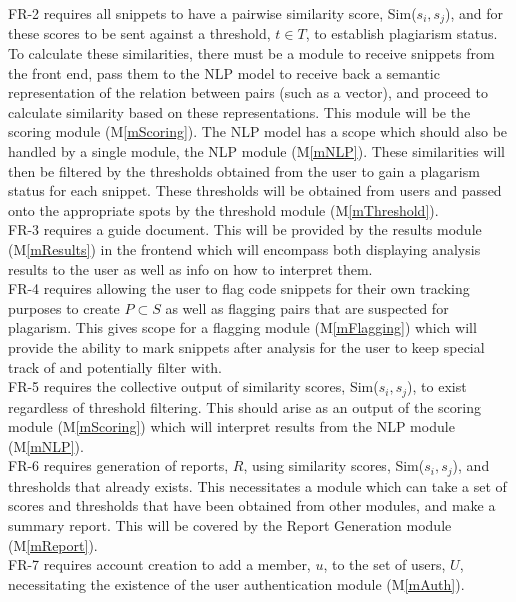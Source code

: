 \documentclass[12pt, titlepage]{article}
\newcommand{\mref}[1]{M\ref{#1}}
\begin{document}
FR-2 requires all snippets to have a pairwise similarity score, Sim($s_i, s_j$), 
and for these scores to be sent against a threshold, $t \in T$, to establish 
plagiarism status. To calculate these similarities, there must be a module to 
receive snippets from the front end, pass them to the NLP model to receive back 
a semantic representation of the relation between pairs (such as a vector), and 
proceed to calculate similarity based on these representations. This module will 
be the scoring module (\mref{mScoring}). The NLP model has a scope which should 
also be handled by a single module, the NLP module (\mref{mNLP}). These similarities 
will then be filtered by the thresholds obtained from the user to gain a plagarism 
status for each snippet. These thresholds will be obtained from users and passed 
onto the appropriate spots by the threshold module ({\mref{mThreshold}}).\\

FR-3 requires a guide document. This will be provided by the results module (\mref{mResults})
in the frontend which will encompass both displaying analysis results to the user as well as 
info on how to interpret them.\\

FR-4 requires allowing the user to flag code snippets for their own tracking purposes
to create $P \subset S$ as well as flagging pairs that are suspected for plagarism. 
This gives scope for a flagging module (\mref{mFlagging}) which will provide the ability 
to mark snippets after analysis for the user to keep special track of and potentially 
filter with.\\

FR-5 requires the collective output of similarity scores, Sim($s_i, s_j$), to exist 
regardless of threshold filtering. This should arise as an output of the scoring module 
(\mref{mScoring}) which will interpret results from the NLP module (\mref{mNLP}).\\

FR-6 requires generation of reports, $R$, using similarity scores, Sim($s_i, s_j$), 
and thresholds that already exists. This necessitates a module which can take a set 
of scores and thresholds that have been obtained from other modules, and make a 
summary report. This will be covered by the Report Generation module (\mref{mReport}).\\

FR-7 requires account creation to add a member, $u$, to the set of users, $U$, necessitating 
the existence of the user authentication module (\mref{mAuth}).\\
\end{document}
